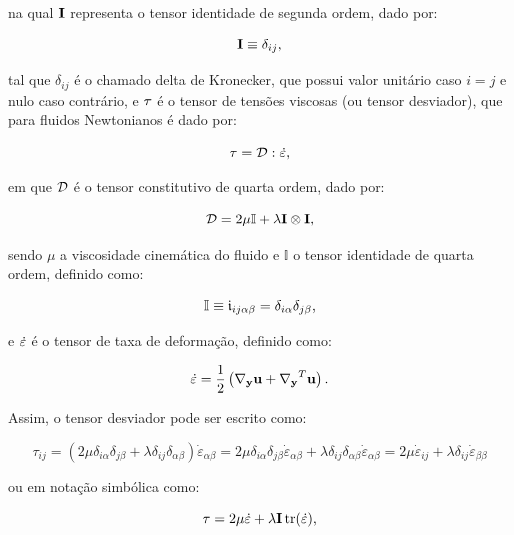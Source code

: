 \documentclass[_ArquivoPrincipal.tex]{subfiles}
\begin{document}
\noindent na qual $\mathbf{I}$ representa o tensor identidade de segunda ordem, dado por:

\begin{equation}
    \mathbf{I}\equiv\delta_{ij}\text{,}
\end{equation}

\noindent tal que $\delta_{ij}$ é o chamado delta de Kronecker, que possui valor unitário caso $i=j$ e nulo caso contrário, e $\mathbf{\tau}$ é o tensor de tensões viscosas (ou tensor desviador), que para fluidos Newtonianos é dado por:

\begin{equation}
    \mathbf{\tau}=\mathcal{D}:\dot{\mathbf{\varepsilon}}\text{,}
\end{equation}

\noindent em que $\mathcal{D}$ é o tensor constitutivo de quarta ordem, dado por:

\begin{equation}
    \mathcal{D}=2\mu\mathbb{I}+\lambda\mathbf{I}\otimes\mathbf{I}\text{,}
\end{equation}

\noindent sendo $\mu$ a viscosidade cinemática do fluido e $\mathbb{I}$ o tensor identidade de quarta ordem, definido como:

\begin{equation}
    \mathbb{I}\equiv\frak{i}_{ij\alpha\beta}=\delta_{i\alpha}\delta_{j\beta}\text{,}
\end{equation}

\noindent e $\dot{\mathbf{\varepsilon}}$ é o tensor de taxa de deformação, definido como:

\begin{equation}
    \dot{\mathbf{\varepsilon}}=\frac{1}{2}\left(\mathbf{\nabla_y}\mathbf{u}+\mathbf{\nabla_y}^T\mathbf{u}\right)\text{.}\label{eq:deftax1}
\end{equation}

Assim, o tensor desviador pode ser escrito como:

\[\tau_{ij}=(2\mu\delta_{i\alpha}\delta_{j\beta}+\lambda\delta_{ij}\delta_{\alpha\beta})\dot{\varepsilon}_{\alpha\beta}=2\mu\delta_{i\alpha}\delta_{j\beta}\dot{\varepsilon}_{\alpha\beta}+\lambda\delta_{ij}\delta_{\alpha\beta}\dot{\varepsilon}_{\alpha\beta}=2\mu\dot{\varepsilon}_{ij}+\lambda\delta_{ij}\dot{\varepsilon}_{\beta\beta}\]

\noindent ou em notação simbólica como:

\begin{equation}
    \mathbf{\tau}=2\mu\dot{\mathbf{\varepsilon}}+\lambda\mathbf{I}\mathop{\mathrm{tr}}\nolimits(\dot{\mathbf{\varepsilon}})\text{,}
\end{equation}
\end{document}
